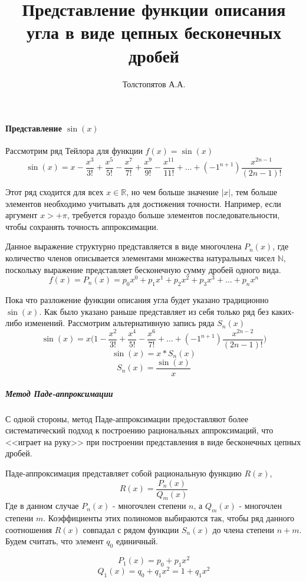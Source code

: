 \documentclass{article}
\title{Представление функции описания угла в виде цепных бесконечных дробей}
\author{Толстопятов А.А.}
\begin{document}
    \maketitle    
    \paragraph*{Представление $\sin(x)$}
    Рассмотрим ряд Тейлора для функции $f(x) = \sin(x)$
    $$\sin(x) = x - \frac{x^3}{3!} + \frac{x^5}{5!} - \frac{x^7}{7!} + \frac{x^9}{9!} - \frac{x^{11}}{11!} + \dots + (-1^{n+1})\frac{x^{2n-1}}{(2n-1)!}$$
    
    Этот ряд сходится для всех $x\in\mathbb{R}$, но чем больше значение $|x|$,
    тем больше элементов необходимо учитывать для достижения точности.
    Например, если аргумент $x > +\pi$, требуется гораздо больше 
    элементов последовательности, чтобы сохранять точность аппроксимации.
    
    Данное выражение структурно представляется в виде 
    многочлена $P_n(x)$, где количество членов описывается 
    элементами множества натуральных чисел $\mathbb{N}$, 
    поскольку выражение представляет бесконечную сумму дробей одного вида.
    $$f(x) = P_n(x) = p_0x^0 + p_1x^1 + p_2x^2 + p_3x^3 + \dots + p_nx^n$$

    Пока что разложение функции описания угла будет указано традиционно $\sin(x)$.
    Как было указано раньше представляет из себя только ряд без каких-либо изменений.
    Рассмотрим альтернативную запись ряда $S_n(x)$
    $$\sin(x) = x\Bigg(1 - \frac{x^2}{3!} + \frac{x^4}{5!} - \frac{x^6}{7!} + \dots + (-1^{n+1})\frac{x^{2n-2}}{(2n-1)!}\Bigg)$$
    $$\sin(x) = x * S_n(x)$$
    $$S_n(x) = \frac{\sin(x)}{x}$$

    \subparagraph{Метод Паде-аппроксимации}
    С одной стороны, 
    метод Паде-аппроксимации предоставляют 
    более систематический подход к построению рациональных аппроксимаций,
    что <<играет на руку>> при построении представления в виде бесконечных
    цепных дробей. 
    
    Паде-аппроксимация представляет собой рациональную функцию 
    $R(x)$,
    $$R(x) = \frac{P_n(x)}{Q_m(x)}$$
    Где в данном случае $P_n(x)$ - многочлен степени $n$, а $Q_m(x)$ - многочлен степени $m$. 
    Коэффициенты этих полиномов выбираются так, 
    чтобы ряд данного соотношения $R(x)$ совпадал с рядом функции
    $S_n(x)$ до члена степени $n+m$. Будем считать, что элемент $q_0$ единичный.

    $$P_1(x) = p_0 + p_1x^2$$
    $$Q_1(x) = q_0 + q_1x^2 = 1 + q_1x^2$$
\end{document}
